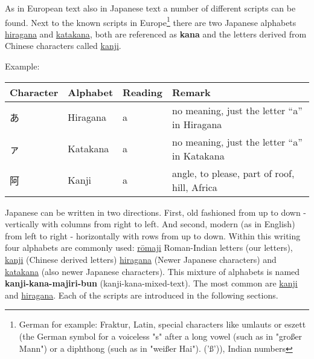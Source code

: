 As in European text also in Japanese text a number of different scripts can be
found. Next to the known scripts in Europe\footnote{German for example:
Fraktur, Latin, special characters like umlauts or eszett (the German
symbol for a voiceless "s" after a long vowel (such as in "großer Mann") or a
diphthong (such as in "weißer Hai"). ('ß')), Indian numbers} there are two
Japanese alphabets
\hyperref[sec:Hiragana]{hiragana} and \hyperref[sec:Katakana]{katakana}, both
are referenced as \textbf{kana} and the letters derived from Chinese characters
called \hyperref[sec:Kanji]{kanji}.

Example:

\begin{center}
\begin{tabular}{|l|l|l|l|}
\textbf{Character}&\textbf{Alphabet}&\textbf{Reading}&\textbf{Remark}\\\hline
あ& Hiragana & a & no meaning, just the letter  ``a'' in Hiragana \\
ァ& Katakana & a & no meaning, just the letter ``a'' in Katakana \\
阿& Kanji    & a & { angle, to please, part of roof, hill, Africa}\\
\end{tabular}
\end{center}

Japanese can be written in two directions. First, old fashioned from up to down
- vertically with columns from right to left. And second, modern (as in
English) from left to right - horizontally with rows from up to down. Within
this writing four alphabets are commonly used:
\hyperref[sec:Romaji]{rōmaji} Roman-Indian letters (our letters),
\hyperref[sec:Kanji]{kanji} (Chinese derived letters)
\hyperref[sec:Hiragana]{hiragana} (Newer Japanese characters) and
\hyperref[sec:Katakana]{katakana}  (also newer Japanese characters).  This
mixture of alphabets is named \textbf{kanji-kana-majiri-bun}
(kanji-kana-mixed-text). The most common are \hyperref[sec:Kanji]{kanji} and
\hyperref[sec:Hiragana]{hiragana}. Each of the scripts are introduced in the
following sections.

